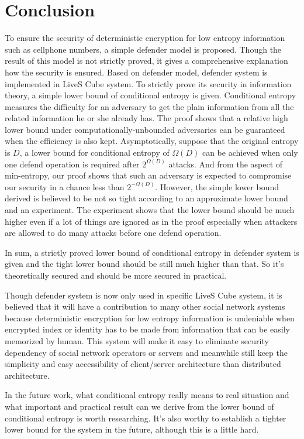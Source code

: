 \documentclass[10pt,a4paper]{article}
\begin{document}
\section{Conclusion}
	To ensure the security of deterministic encryption
	for low entropy information such as cellphone numbers,
	a simple defender model is proposed. Though the result
	of this model is not strictly proved, it gives a comprehensive
	explanation how the security is ensured.
	Based on defender model, defender system is implemented in LiveS Cube
	system. To strictly prove its security in information theory,
	a simple lower bound of conditional entropy is given.
	Conditional entropy measures the difficulty for an adversary
	to get the plain information from all the related information
	he or she already has.
	The proof shows that a relative high lower bound
	under computationally-unbounded adversaries can be guaranteed
	when the efficiency is also kept.
	Asymptotically, suppose that the original entropy is $D$,
	a lower bound for conditional entropy of $\Omega(D)$ can be
	achieved when only one defend operation is required after
	$2^{\Omega(D)}$ attacks.
	And from the aspect of min-entropy, our proof shows that
	such an adversary is expected to compromise our security
	in a chance less than $2^{-\Omega(D)}$.
	However, the simple lower bound derived
	is believed to be not so tight according to an approximate lower bound 
	and an experiment. The experiment shows that the lower bound
	should be much higher even if a lot of things are ignored as
	in the proof especially when attackers are allowed to do many
	attacks before one defend operation. 
	
	In sum, a strictly proved lower bound of conditional entropy
	in defender system is given
	and the tight lower bound should be still much higher than that.
	So it's theoretically secured and should be more secured in practical.	
	
	Though defender system is now only used in specific LiveS Cube system,
	it is believed that it will have a contribution to many other social
	network systems because deterministic encryption for low entropy
	information is undeniable when encrypted index or identity has to be made
	from information that can be easily memorized by human. This system will
	make it easy to eliminate security dependency of social network operators
	or servers
	and meanwhile still keep the simplicity and easy accessibility of
	client/server architecture than distributed architecture.
	
	In the future work, what conditional entropy really means to
	real situation and what important and practical
	result can we derive from the lower bound of
	conditional entropy is worth researching.
	It's also worthy to establish a tighter lower bound
	for the system in the future, although this is
	a little hard.
		
\end{document}

